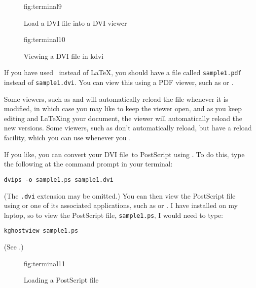 \begin{figure}[htbp]
  {\caption{Load a DVI file into a DVI viewer}}
  {fig:terminal9}
\end{figure}

\begin{figure}[htbp]
  {\caption{Viewing a DVI file in kdvi}}
  {fig:terminal10}
\end{figure}

If you have used \iPDFLaTeX\ instead of \LaTeX, you should have a
file called \texttt{sample1.pdf} instead of \texttt{sample1.dvi}.
You can view this using a PDF viewer, such as 
or .

Some viewers, such as  and  will
automatically reload the file whenever it is modified, in which case
you may like to keep the viewer open, and as you keep editing and
\LaTeX{}ing your document, the viewer will automatically reload the
new versions. Some viewers, such as  don't
automatically reload, but have a reload facility, which you can use
whenever you .

\label{obj:dvips}
If you like, you can convert your DVI file\indexDVI\ to PostScript 
using . To do this, type the following at the command
prompt in your terminal:
\begin{verbatim}
dvips -o sample1.ps sample1.dvi
\end{verbatim}
(The \texttt{.dvi} extension may be omitted.)
You can then view the PostScript file using 
or one of its associated applications, such as 
or . I have  installed on
my laptop, so to view the PostScript file, \texttt{sample1.ps},
I would need to type:
\begin{verbatim}
kghostview sample1.ps
\end{verbatim}
(See .)

\begin{figure}[htbp]
  {\caption{Loading a PostScript file}}
  {fig:terminal11}
\end{figure}

